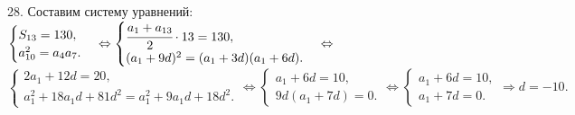 28. Составим систему уравнений: $\begin{cases}S_{13}=130,\\ a_{10}^2=a_4a_7.\end{cases}\Leftrightarrow
\begin{cases}\cfrac{a_1+a_{13}}{2}\cdot13=130,\\ (a_1+9d)^2=(a_1+3d)(a_1+6d).\end{cases}\Leftrightarrow$\\$
\begin{cases}2a_1+12d=20,\\ a_1^2+18a_1d+81d^2=a_1^2+9a_1d+18d^2.\end{cases}\Leftrightarrow
\begin{cases}a_1+6d=10,\\ 9d(a_1+7d)=0.\end{cases}\Leftrightarrow
\begin{cases}a_1+6d=10,\\ a_1+7d=0.\end{cases}\Rightarrow
d=-10.$\\
